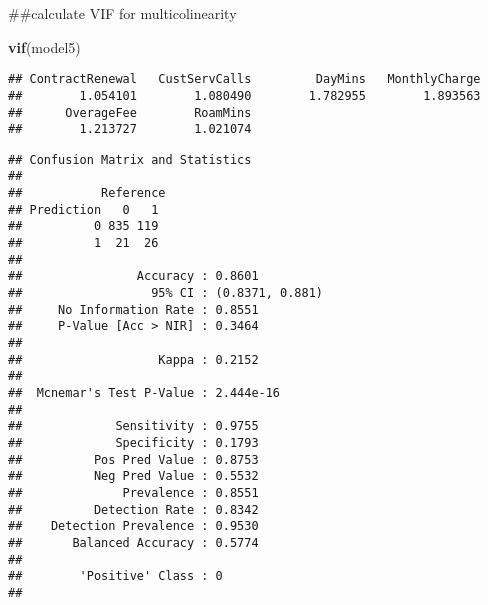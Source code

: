 \documentclass[]{article}
\newenvironment{Shaded}{\begin{snugshade}}{\end{snugshade}}
\newcommand{\KeywordTok}[1]{\textcolor[rgb]{0.13,0.29,0.53}{\textbf{#1}}}
\newcommand{\DataTypeTok}[1]{\textcolor[rgb]{0.13,0.29,0.53}{#1}}
\newcommand{\DecValTok}[1]{\textcolor[rgb]{0.00,0.00,0.81}{#1}}
\newcommand{\StringTok}[1]{\textcolor[rgb]{0.31,0.60,0.02}{#1}}
\newcommand{\OperatorTok}[1]{\textcolor[rgb]{0.81,0.36,0.00}{\textbf{#1}}}
\newcommand{\NormalTok}[1]{#1}
\begin{document}
\begin{Shaded}
\begin{Highlighting}[]
\NormalTok{  ##calculate VIF for multicolinearity }
  
  \KeywordTok{vif}\NormalTok{(model5)}
\end{Highlighting}
\end{Shaded}

\begin{verbatim}
## ContractRenewal   CustServCalls         DayMins   MonthlyCharge 
##        1.054101        1.080490        1.782955        1.893563 
##      OverageFee        RoamMins 
##        1.213727        1.021074
\end{verbatim}

\begin{Shaded}
\end{Shaded}

\begin{verbatim}
## Confusion Matrix and Statistics
## 
##           Reference
## Prediction   0   1
##          0 835 119
##          1  21  26
##                                          
##                Accuracy : 0.8601         
##                  95% CI : (0.8371, 0.881)
##     No Information Rate : 0.8551         
##     P-Value [Acc > NIR] : 0.3464         
##                                          
##                   Kappa : 0.2152         
##                                          
##  Mcnemar's Test P-Value : 2.444e-16      
##                                          
##             Sensitivity : 0.9755         
##             Specificity : 0.1793         
##          Pos Pred Value : 0.8753         
##          Neg Pred Value : 0.5532         
##              Prevalence : 0.8551         
##          Detection Rate : 0.8342         
##    Detection Prevalence : 0.9530         
##       Balanced Accuracy : 0.5774         
##                                          
##        'Positive' Class : 0              
## 
\end{verbatim}
\end{document}
